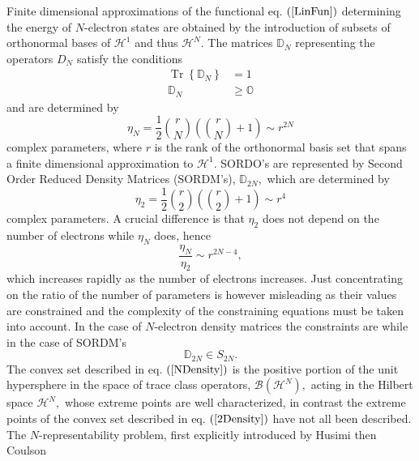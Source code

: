 \documentclass[aps,preprint]{revtex4}%
\begin{document}
Finite dimensional approximations of the functional eq. $\left(
\ref{LinFun}\right)  $ determining the energy of $N$-electron states are
obtained by the introduction of subsets of orthonormal bases of $\mathcal{H}%
^{1}$ and thus $\mathcal{H}^{N}.$ The matrices $\mathbb{D}_{N}$ representing
the operators $D_{N}$ satisfy the conditions
\begin{align}
\operatorname*{Tr}\left\{  \mathbb{D}_{N}\right\}   &  =1\nonumber\\
\mathbb{D}_{N}  &  \geq\mathbb{O} \label{NDensity}%
\end{align}
and are determined by
\begin{equation}
\eta_{N}=\frac{1}{2}\binom{r}{N}\left(  \binom{r}{N}+1\right)  \sim r^{2N}
\label{NDenSize}%
\end{equation}
complex parameters, where $r$ is the rank of the orthonormal basis set that
spans a finite dimensional approximation to $\mathcal{H}^{1}.$ SORDO's are
represented by Second Order Reduced Density Matrices (SORDM's), $\mathbb{D}%
_{2N},$ which are determined by
\begin{equation}
\eta_{2}=\frac{1}{2}\binom{r}{2}\left(  \binom{r}{2}+1\right)  \sim r^{4}
\label{2DenSize}%
\end{equation}
complex parameters. A crucial difference is that $\eta_{2}$ does not depend on
the number of electrons while $\eta_{N}$ does, hence
\begin{equation}
\frac{\eta_{N}}{\eta_{2}}\sim r^{2N-4}, \label{RatioSize}%
\end{equation}
which increases rapidly as the number of electrons increases. Just
concentrating on the ratio of the number of parameters is however misleading
as their values are constrained and the complexity of the constraining
equations must be taken into account. In the case of $N$-electron density
matrices the constraints are while in the case of SORDM's
\begin{equation}
\mathbb{D}_{2N}\in S_{2N}. \label{2Density}%
\end{equation}
The convex set described in eq. $\left(  \ref{NDensity}\right)  $ is the
positive portion of the unit hypersphere in the space of trace class
operators, $\mathcal{B}\left(  \mathcal{H}^{N}\right)  ,$ acting in the
Hilbert space $\mathcal{H}^{N},$ whose extreme points are well characterized,
in contrast the extreme points of the convex set described in eq. $\left(
\ref{2Density}\right)  $ have not all been described. The $N$-representability
problem, first explicitly introduced by Husimi \cite{Husimi} then Coulson
\cite{Coulson}
\end{document}
